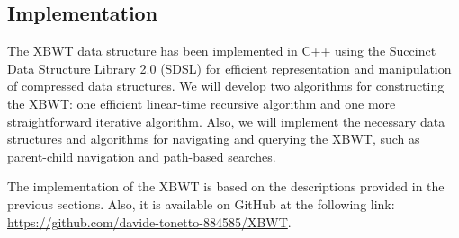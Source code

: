\subsection{Implementation}
The XBWT data structure has been implemented in C++ using the Succinct Data Structure Library 2.0 (SDSL) for efficient representation and manipulation of compressed data structures. We will develop two algorithms for constructing the XBWT: one efficient linear-time recursive algorithm and one more straightforward iterative algorithm. Also, we will implement the necessary data structures and algorithms for navigating and querying the XBWT, such as parent-child navigation and path-based searches. 

The implementation of the XBWT is based on the descriptions provided in the previous sections. Also, it is available on GitHub at the following link: \url{https://github.com/davide-tonetto-884585/XBWT}.

